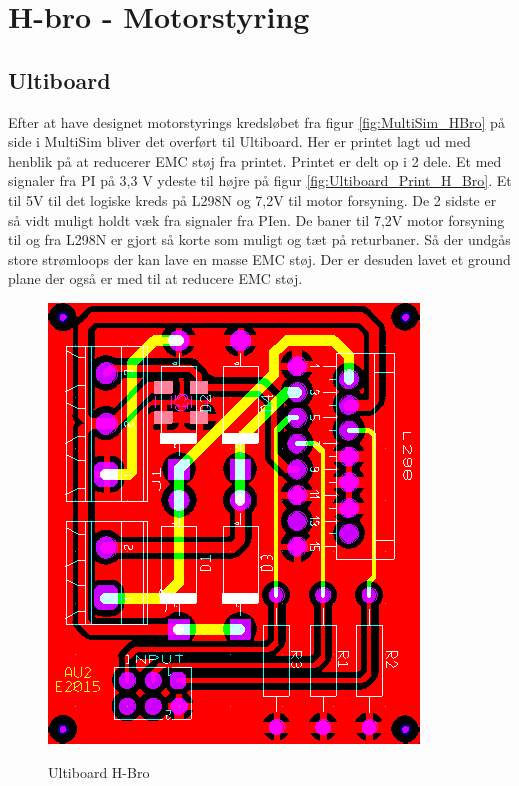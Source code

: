 \section{H-bro - Motorstyring} \label{sec:hwi_motor_driver}
\subsection*{Ultiboard}

Efter at have designet motorstyrings kredsløbet fra figur \ref{fig:MultiSim_HBro} på side \pageref{fig:MultiSim_HBro} i MultiSim bliver det overført til Ultiboard. Her er printet lagt ud med henblik på at reducerer EMC støj fra printet. Printet er delt op i 2 dele. Et med signaler fra PI på 3,3 V ydeste til højre på figur \ref{fig:Ultiboard_Print_H_Bro}. Et til 5V til det logiske kreds på L298N og 7,2V til motor forsyning. De 2 sidste er så vidt muligt holdt væk fra signaler fra PIen. De baner til 7,2V motor forsyning til og fra L298N er gjort så korte som muligt og tæt på returbaner. Så der undgås store strømloops der kan lave en masse EMC støj. Der er desuden lavet et ground plane der også er med til at reducere EMC støj.

\begin{figure}[h]
	\centering
	\includegraphics[width=\textwidth* 4/10, angle =90]{../fig/billeder/Ultiboard_H_Bro}
	\label{fig:Ultiboard_H_Bro}
	\caption{Ultiboard H-Bro}
\end{figure}

